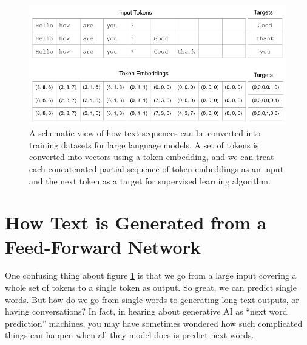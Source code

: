 \begin{figure}[h]
\centering
\includegraphics[scale=.45]{./images/contextWindow}
\caption[Jeff Yoshimi]{A schematic view of how text sequences can be converted into training datasets for large language models. A set of tokens is converted into vectors using a token embedding, and we can treat each concatenated partial sequence of token embeddings as an input and the next token as a target for supervised learning algorithm. }
\label{nextWordPrediction}
\end{figure}
  
\section{How Text is Generated from a Feed-Forward Network}


One confusing thing about figure \ref{nextWordPrediction} is that we go from a large input covering a whole set of tokens to a single token as output. So great, we can predict single words. But how do we go from single words to generating long text outputs, or having conversations? In fact, in hearing about generative AI as ``next word prediction'' machines, you may have sometimes wondered how such complicated things can happen when all they model does is predict next words.

